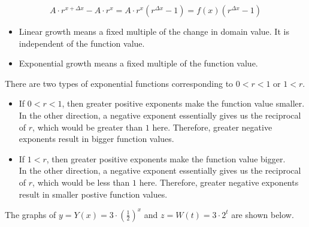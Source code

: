 \documentclass{ximera}
\begin{document}
\[
A \cdot r^{x + \Delta x} - A \cdot r^x = A \cdot r^x (r^{\Delta x} - 1) = f(x) (r^{\Delta x} - 1)
\]

\begin{itemize}
\item Linear growth means a fixed multiple of the change in domain value. It is independent of the function value.
\item Exponential growth means a fixed multiple of the function value. 
\end{itemize}





There are two types of exponential functions corresponding to $0<r<1$ or $1<r$.






\begin{itemize}
\item If $0<r<1$, then greater positive exponents make the function value smaller.   \\
In the other direction, a negative exponent essentially gives us the reciprocal of $r$, which would be greater than $1$ here.  Therefore, greater negative exponents result in bigger function values. 

\item If $1<r$, then greater positive exponents make the function value bigger.   \\ 
In the other direction, a negative exponent essentially gives us the reciprocal of $r$, which would be less than $1$ here.  Therefore, greater negative exponents result in smaller postive function values.
\end{itemize}



The graphs of $y = Y(x) = 3 \cdot \left(\frac{1}{2}\right)^x$ and $z = W(t) = 3 \cdot 2^t$ are shown below.
\end{document}
